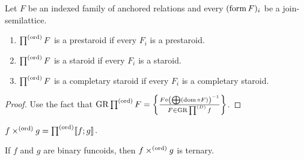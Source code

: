 \begin{cor}
Let $F$ be an indexed family of anchored relations and every $(\operatorname{form} F)_{i}$
be a join-semilattice.
\begin{enumerate}
\item $\prod^{(\operatorname{ord})}F$ is a prestaroid if every $F_{i}$ is a prestaroid.
\item $\prod^{(\operatorname{ord})}F$ is a staroid if every $F_{i}$ is a staroid.
\item $\prod^{(\operatorname{ord})}F$ is a completary staroid if every $F_{i}$ is a
completary staroid.
\end{enumerate}
\end{cor}
\begin{proof}
Use the fact that $\operatorname{GR}\prod^{(\operatorname{ord})}F=\left\{ \frac{F\circ\left(\bigoplus(\operatorname{dom}\circ F)\right)^{-1}}{F\in\operatorname{GR}\prod^{(D)}f}\right\}$.\end{proof}
\begin{defn}
$f\times^{(\operatorname{ord})}g=\prod^{(\operatorname{ord})}\llbracket f;g\rrbracket$.\end{defn}
\begin{rem}
If $f$ and $g$ are binary funcoids, then $f\times^{(\operatorname{ord})}g$ is
ternary.
\end{rem}

